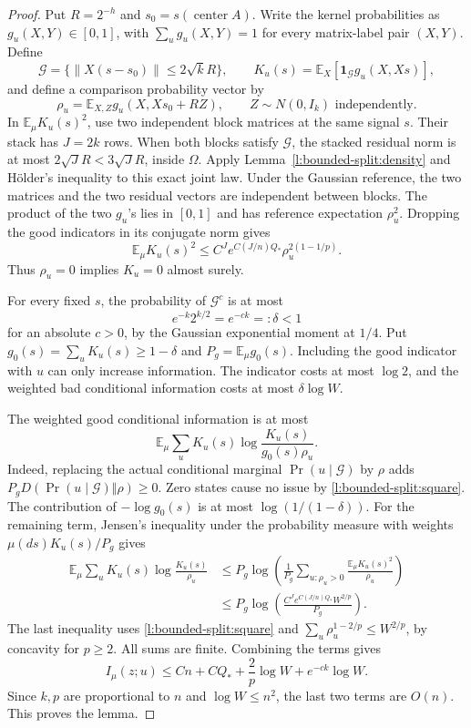 \begin{proof}
Put \(R=2^{-h}\) and \(s_0=s(\operatorname{center}A)\).
Write the kernel probabilities as \(g_u(X,Y)\in[0,1]\), with
\(\sum_ug_u(X,Y)=1\) for every matrix-label pair \((X,Y)\).  Define
\[
 \mathcal G=\{\|X(s-s_0)\|\le2\sqrt k R\},\qquad
 K_u(s)=\mathbb E_X[\mathbf1_{\mathcal G}g_u(X,Xs)],
\]
and define a comparison probability vector by
\[
 \rho_u=\mathbb E_{X,Z}g_u(X,Xs_0+RZ),
 \qquad Z\sim N(0,I_k)\text{ independently}.
\]
In \(\mathbb E_\mu K_u(s)^2\), use two independent block matrices
at the same signal \(s\).  Their stack has \(J=2k\) rows.
When both blocks satisfy \(\mathcal G\), the stacked residual norm
is at most \(2\sqrt J R<3\sqrt J R\), inside \(\Omega\).
Apply Lemma~\ref{l:bounded-split:density} and H\"older's inequality
to this exact joint law.  Under the Gaussian reference, the two
matrices and the two residual vectors are independent between blocks.
The product of the two \(g_u\)'s lies in \([0,1]\) and has
reference expectation \(\rho_u^2\).  Dropping the good indicators
in its conjugate norm gives
\begin{equation}\label{l:bounded-split:square}
 \mathbb E_\mu K_u(s)^2
 \le C^J e^{C(J/n)Q_*}\rho_u^{2(1-1/p)}.
\end{equation}
Thus \(\rho_u=0\) implies \(K_u=0\) almost surely.

For every fixed \(s\), the probability of \(\mathcal G^c\) is
at most
\[
 e^{-k}2^{k/2}=e^{-ck}=:\delta<1
\]
for an absolute \(c>0\), by the Gaussian exponential moment at
\(1/4\).  Put \(g_0(s)=\sum_uK_u(s)\ge1-\delta\) and
\(P_g=\mathbb E_\mu g_0(s)\).  Including the good indicator
with \(u\) can only increase information.  The indicator costs at
most \(\log2\), and the weighted bad conditional information costs
at most \(\delta\log W\).

The weighted good conditional information is at most
\begin{equation}\label{l:bounded-split:good-kl}
 \mathbb E_\mu\sum_uK_u(s)
       \log\frac{K_u(s)}{g_0(s)\rho_u}.
\end{equation}
Indeed, replacing the actual conditional marginal
\(\Pr(u\mid\mathcal G)\) by \(\rho\) adds
\(P_gD(\Pr(u\mid\mathcal G)\Vert\rho)\ge0\).
Zero states cause no issue by \eqref{l:bounded-split:square}.
The contribution of \(-\log g_0(s)\) is at most
\(\log(1/(1-\delta))\).  For the remaining term, Jensen's inequality
under the probability measure with weights
\(\mu(ds)K_u(s)/P_g\) gives
\[
 \begin{split}
 \mathbb E_\mu\sum_uK_u(s)\log\frac{K_u(s)}{\rho_u}
 &\le P_g\log\left(\frac1{P_g}
      \sum_{u:\rho_u>0}\frac{\mathbb E_\mu K_u(s)^2}{\rho_u}\right)\\
 &\le P_g\log\left(
      \frac{C^J e^{C(J/n)Q_*}W^{2/p}}{P_g}\right).
 \end{split}
\]
The last inequality uses \eqref{l:bounded-split:square} and
\(\sum_u\rho_u^{1-2/p}\le W^{2/p}\), by concavity for \(p\ge2\).
All sums are finite.  Combining the terms gives
\[
 I_\mu(z;u)\le Cn+CQ_*+\frac2p\log W+e^{-ck}\log W.
\]
Since \(k,p\) are proportional to \(n\) and \(\log W\le n^2\),
the last two terms are \(O(n)\).  This proves the lemma.
\end{proof}

